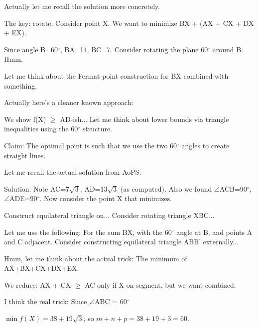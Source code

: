 \begin{decodedreasoningpanel}
Actually let me recall the solution more concretely. 

The key: rotate. Consider point X. We want to minimize BX + (AX + CX + DX + EX). 

Since angle B=60\ensuremath{^\circ}, BA=14, BC=7. Consider rotating the plane 60\ensuremath{^\circ} around B. Hmm.

Let me think about the Fermat-point construction for BX combined with something.

Actually here's a cleaner known approach: 

We show f(X) \ensuremath{\geq} AD-ish... Let me think about lower bounds via triangle inequalities using the 60\ensuremath{^\circ} structure.

Claim: The optimal point is such that we use the two 60\ensuremath{^\circ} angles to create straight lines.

Let me recall the actual solution from AoPS.

Solution: Note AC=7\ensuremath{\sqrt{3}}, AD=13\ensuremath{\sqrt{3}} (as computed). Also we found \ensuremath{\angle}ACB=90\ensuremath{^\circ}, \ensuremath{\angle}ADE=90\ensuremath{^\circ}. Now consider the point X that minimizes. 

Construct equilateral triangle on... Consider rotating triangle XBC... 

Let me use the following: For the sum BX, with the 60\ensuremath{^\circ} angle at B, and points A and C adjacent. Consider constructing equilateral triangle ABB' externally... 

Hmm, let me think about the actual trick: The minimum of AX+BX+CX+DX+EX.

We reduce: AX + CX \ensuremath{\geq} AC only if X on segment, but we want combined.

I think the real trick: Since \ensuremath{\angle}ABC = 60\ensuremath{^\circ}
\end{decodedreasoningpanel}
\begin{decodedanswerpanel}
$\min f(X){=}38{+}19\sqrt3$, so $m{+}n{+}p{=}38{+}19{+}3{=}60$.
\end{decodedanswerpanel}
